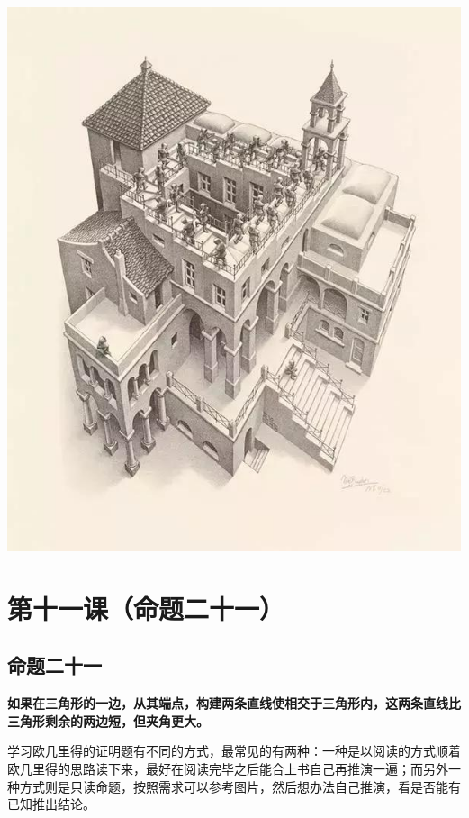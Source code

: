 \documentclass[
]{book}
\begin{document}
\includegraphics[width=1\linewidth]{./image/10-prop20-image12}

\hypertarget{ux7b2cux5341ux4e00ux8bfeux547dux9898ux4e8cux5341ux4e00}{%
\chapter{第十一课（命题二十一）}\label{ux7b2cux5341ux4e00ux8bfeux547dux9898ux4e8cux5341ux4e00}}

\hypertarget{ux547dux9898ux4e8cux5341ux4e00}{%
\section{命题二十一}\label{ux547dux9898ux4e8cux5341ux4e00}}

\textbf{如果在三角形的一边，从其端点，构建两条直线使相交于三角形内，这两条直线比三角形剩余的两边短，但夹角更大。}

学习欧几里得的证明题有不同的方式，最常见的有两种：一种是以阅读的方式顺着欧几里得的思路读下来，最好在阅读完毕之后能合上书自己再推演一遍；而另外一种方式则是只读命题，按照需求可以参考图片，然后想办法自己推演，看是否能有已知推出结论。
\end{document}
